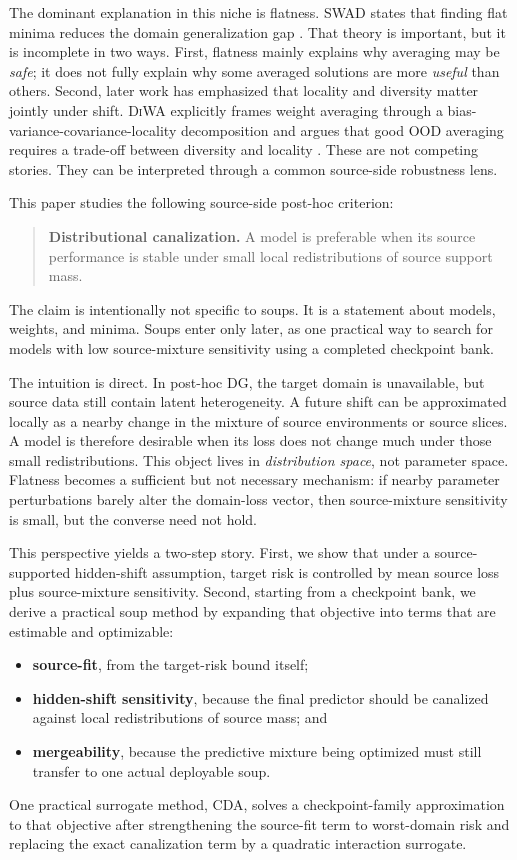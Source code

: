 \documentclass{article}
\theoremstyle{definition}
\newcommand{\cda}{\textup{\textsc{CDA}}}
\newcommand{\swad}{\textup{\textsc{SWAD}}}
\newcommand{\diwa}{\textup{\textsc{DiWA}}}
\newcommand{\ood}{\textup{\textsc{OOD}}}
\begin{document}
The dominant explanation in this niche is flatness. \swad{} states that finding flat minima reduces the domain generalization gap \citep{cha2021swad}. That theory is important, but it is incomplete in two ways. First, flatness mainly explains why averaging may be \emph{safe}; it does not fully explain why some averaged solutions are more \emph{useful} than others. Second, later work has emphasized that locality and diversity matter jointly under shift. \diwa{} explicitly frames weight averaging through a bias-variance-covariance-locality decomposition and argues that good \ood{} averaging requires a trade-off between diversity and locality \citep{rame2022diwa}. These are not competing stories. They can be interpreted through a common source-side robustness lens.

This paper studies the following source-side post-hoc criterion:
\begin{quote}
\textbf{Distributional canalization.} A model is preferable when its source performance is stable under small local redistributions of source support mass.
\end{quote}

The claim is intentionally not specific to soups. It is a statement about models, weights, and minima. Soups enter only later, as one practical way to search for models with low source-mixture sensitivity using a completed checkpoint bank.

The intuition is direct. In post-hoc DG, the target domain is unavailable, but source data still contain latent heterogeneity. A future shift can be approximated locally as a nearby change in the mixture of source environments or source slices. A model is therefore desirable when its loss does not change much under those small redistributions. This object lives in \emph{distribution space}, not parameter space. Flatness becomes a sufficient but not necessary mechanism: if nearby parameter perturbations barely alter the domain-loss vector, then source-mixture sensitivity is small, but the converse need not hold.

This perspective yields a two-step story. First, we show that under a source-supported hidden-shift assumption, target risk is controlled by mean source loss plus source-mixture sensitivity. Second, starting from a checkpoint bank, we derive a practical soup method by expanding that objective into terms that are estimable and optimizable:
\begin{itemize}[leftmargin=1.3em]
    \item \textbf{source-fit}, from the target-risk bound itself;
    \item \textbf{hidden-shift sensitivity}, because the final predictor should be canalized against local redistributions of source mass; and
    \item \textbf{mergeability}, because the predictive mixture being optimized must still transfer to one actual deployable soup.
\end{itemize}
One practical surrogate method, \cda{}, solves a checkpoint-family approximation to that objective after strengthening the source-fit term to worst-domain risk and replacing the exact canalization term by a quadratic interaction surrogate.
\end{document}
